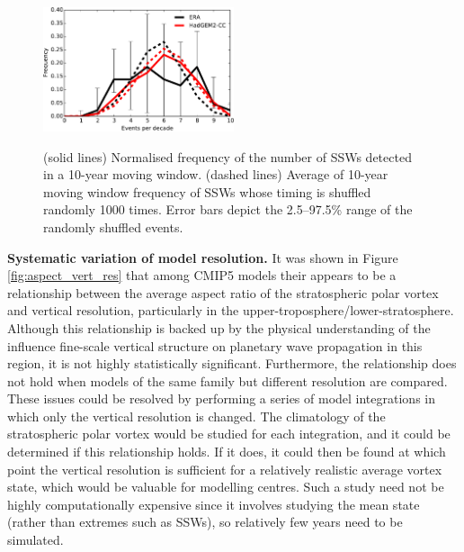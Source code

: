 \begin{figure}[t]
  \centering
  \noindent\includegraphics[width=0.5\textwidth,angle=0]{figures/chapter-conclusions/events_decadal.pdf}\\
  \caption[Decadal variability of SSWs]{(solid lines) Normalised frequency of
    the number of SSWs detected in a 10-year moving window. (dashed lines)
    Average of 10-year moving window frequency of SSWs whose timing is shuffled
    randomly 1000 times. Error bars depict the 2.5--97.5\%
    range of the randomly shuffled events.}\label{fig:decadal}
\end{figure}

\bigskip\noindent\textbf{Systematic variation of model resolution.} It was shown
in Figure \ref{fig:aspect_vert_res} that among CMIP5 models their appears to be
a relationship between the average aspect ratio of the stratospheric polar
vortex and vertical resolution, particularly in the
upper-troposphere/lower-stratosphere. Although this relationship is backed up by
the physical understanding of the influence fine-scale vertical structure on
planetary wave propagation in this region, it is not highly statistically
significant. Furthermore, the relationship does not hold when models of the same
family but different resolution are compared. These issues could be resolved by
performing a series of model integrations in which only the vertical resolution
is changed. The climatology of the stratospheric polar vortex would be studied
for each integration, and it could be determined if this relationship holds. If
it does, it could then be found at which point the vertical resolution is
sufficient for a relatively realistic average vortex state, which would be
valuable for modelling centres. Such a study need not be highly computationally
expensive since it involves studying the mean state (rather than extremes such
as SSWs), so relatively few years need to be simulated. 

